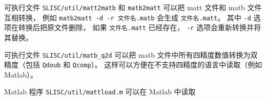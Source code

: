 可执行文件 \verb|SLISC/util/matt2matb| 和 \verb|matb2matt| 可以把 matt 文件和 matb 文件互相转换， 例如 \verb|matb2matt -d -r 文件名.matb| 会生成 \verb|文件名.matt|。 其中 \verb|-d| 选项在转换后把原文件删除， 如果 \verb|文件名.matt| 已经存在， \verb|-r| 选项会重新转换并将其替换。

可执行文件 \verb|SLISC/util/matb_q2d| 可以把 matb 文件中所有四精度数值转换为双精度（包括 \verb|Qdoub| 和 \verb|Qcomp|）。 这样可以方便在不支持四精度的语言中读取（例如 Matlab）。

Matlab 程序 \verb|SLISC/util/mattload.m| 可以在 Matlab 中读取